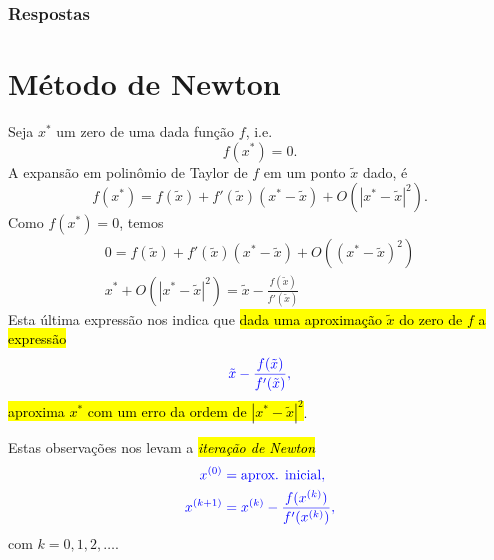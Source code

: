 \ifisbook
\subsubsection{Respostas}
\shipoutAnswer
\fi


\section{Método de Newton}\label{cap_eq1d_sec_newton}

Seja $x^*$ um zero de uma dada função $f$, i.e.
\begin{equation}
  f(x^*)=0.
\end{equation}
A expansão em polinômio de Taylor{\taylor} de $f$ em um ponto $\tilde{x}$ dado, é
\begin{equation}
  f(x^*) = f(\tilde{x}) + f'(\tilde{x})(x^*-\tilde{x}) + O(|x^*-\tilde{x}|^2).
\end{equation}
Como $f(x^*)=0$, temos
\begin{gather}
  0 = f(\tilde{x}) + f'(\tilde{x})(x^*-\tilde{x}) + O((x^*-\tilde{x})^2)\\
  x^* + O(|x^*-\tilde{x}|^2) = \tilde{x} - \frac{f(\tilde{x})}{f'(\tilde{x})}
\end{gather}
Esta última expressão nos indica que \hl{dada uma aproximação $\tilde{x}$ do zero de $f$ a expressão}
\begin{equation}
  \color{blue}\tilde{x} - \frac{f(\tilde{x})}{f'(\tilde{x})},
\end{equation}
\hl{aproxima $x^*$ com um erro da ordem de $|x^*-\tilde{x}|^2$}.

Estas observações nos levam a \hl{\emph{iteração de Newton}}
\begin{align}
  \color{blue}x^{(0)} &\color{blue}= \text{aprox. inicial},\\
  \color{blue}x^{(k+1)} &\color{blue}= x^{(k)} - \frac{f(x^{(k)})}{f'(x^{(k)})},\label{cap_eq1d_sec_newton:eq:Newton_iteracao}
\end{align}
com $k=0, 1, 2, \ldots$.

